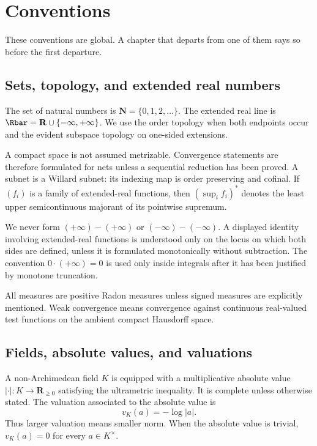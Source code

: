 \chapter*{Conventions}
\label{front:conventions}

These conventions are global.  A chapter that departs from one of them says
so before the first departure.

\section*{Sets, topology, and extended real numbers}
\label{front:conventions-topology}

The set of natural numbers is \(\mathbf N=\{0,1,2,\ldots\}\).  The extended
real line is \(\Rbar=\mathbf R\cup\{-\infty,+\infty\}\).  We use the order
topology when both endpoints occur and the evident subspace topology on
one-sided extensions.

A compact space is not assumed metrizable.  Convergence statements are
therefore formulated for nets unless a sequential reduction has been proved.
A subnet is a Willard subnet: its indexing map is order preserving and
cofinal.  If \((f_i)\) is a family of extended-real functions, then
\((\sup_i f_i)^*\) denotes the least upper semicontinuous majorant of its
pointwise supremum.

We never form \((+\infty)-(+\infty)\) or
\((-\infty)-(-\infty)\).  A displayed identity involving extended-real
functions is understood only on the locus on which both sides are defined,
unless it is formulated monotonically without subtraction.  The convention
\(0\cdot(+\infty)=0\) is used only inside integrals after it has been justified
by monotone truncation.

All measures are positive Radon measures unless signed measures are
explicitly mentioned.  Weak convergence means convergence against continuous
real-valued test functions on the ambient compact Hausdorff space.

\section*{Fields, absolute values, and valuations}
\label{front:conventions-valuations}

A non-Archimedean field \(K\) is equipped with a multiplicative absolute value
\(|\cdot|:K\to\mathbf R_{\ge0}\) satisfying the ultrametric inequality.  It is
complete unless otherwise stated.  The valuation associated to the absolute
value is
\[
  v_K(a)=-\log|a|.
\]
Thus larger valuation means smaller norm.  When the absolute value is trivial,
\(v_K(a)=0\) for every \(a\in K^\times\).

